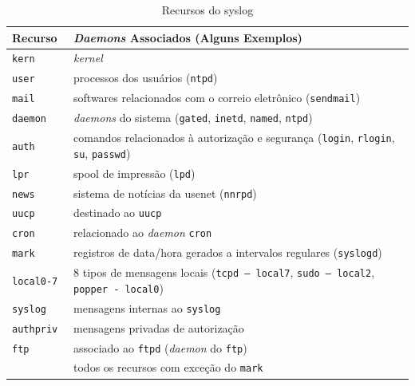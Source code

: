 \begin{table}[!htb]
\begin{center}
  \caption{Recursos do {\ttfamily syslog}}
  \label{tab:outro}
  \small
  \begin{tabular}{l|p{9cm}}
    \hline
    \rowcolor[gray]{.9}
    \bf Recurso & \bf {\em Daemons} Associados (Alguns Exemplos) \\
    \hline
    \hline
    \tt kern & \em kernel  \\
    \tt user & processos dos usuários ({\tt ntpd}) \\
    \tt mail & softwares relacionados com o correio eletrônico ({\tt sendmail})\\
    \tt daemon & {\em daemons} do sistema ({\tt gated}, {\tt inetd}, 
    {\tt named}, {\tt ntpd})\\
    \tt auth &  comandos relacionados à autorização e segurança 
    ({\tt login}, {\tt rlogin}, {\tt su}, {\tt passwd}) \\
    \tt lpr & spool de impressão ({\tt lpd})\\
    \tt news & sistema de notícias da usenet ({\tt nnrpd})\\
    \tt uucp & destinado ao {\tt uucp}\\
    \tt cron & relacionado ao {\em daemon} {\tt cron}\\
    \tt mark &  registros de data/hora gerados a intervalos regulares 
    ({\tt syslogd})\\
    \tt local0-7 & 8 tipos de mensagens locais \newline
    ({\tt tcpd -- local7}, {\tt sudo -- local2}, {\tt popper - local0}) \\
    \tt syslog &  mensagens internas ao {\tt syslog}\\
    \tt authpriv & mensagens privadas de autorização\\
    \tt ftp & associado ao {\tt ftpd} ({\em daemon} do {\tt ftp}) \\
    \tt * &  todos os recursos com exceção do {\tt mark}\\
    \hline
  \end{tabular}
\end{center}
\end{table}


